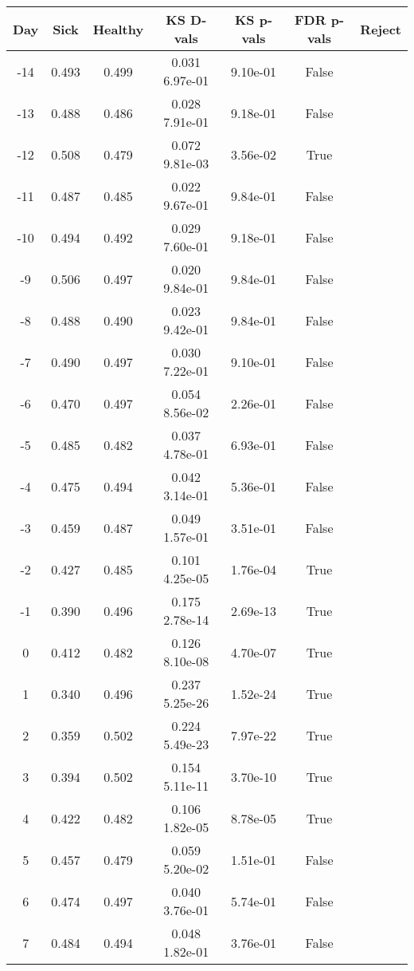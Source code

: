 \begin{tabular}{c|c|c|c|c|c|c}
Day &  Sick & Healthy &  KS D-vals &  KS p-vals & FDR p-vals & Reject\\
\hline
-14 & 0.493 &   0.499 &   0.031   6.97e-01 &   9.10e-01 &  False\\
-13 & 0.488 &   0.486 &   0.028   7.91e-01 &   9.18e-01 &  False\\
-12 & 0.508 &   0.479 &   0.072   9.81e-03 &   3.56e-02 &   True\\
-11 & 0.487 &   0.485 &   0.022   9.67e-01 &   9.84e-01 &  False\\
-10 & 0.494 &   0.492 &   0.029   7.60e-01 &   9.18e-01 &  False\\
 -9 & 0.506 &   0.497 &   0.020   9.84e-01 &   9.84e-01 &  False\\
 -8 & 0.488 &   0.490 &   0.023   9.42e-01 &   9.84e-01 &  False\\
 -7 & 0.490 &   0.497 &   0.030   7.22e-01 &   9.10e-01 &  False\\
 -6 & 0.470 &   0.497 &   0.054   8.56e-02 &   2.26e-01 &  False\\
 -5 & 0.485 &   0.482 &   0.037   4.78e-01 &   6.93e-01 &  False\\
 -4 & 0.475 &   0.494 &   0.042   3.14e-01 &   5.36e-01 &  False\\
 -3 & 0.459 &   0.487 &   0.049   1.57e-01 &   3.51e-01 &  False\\
 -2 & 0.427 &   0.485 &   0.101   4.25e-05 &   1.76e-04 &   True\\
 -1 & 0.390 &   0.496 &   0.175   2.78e-14 &   2.69e-13 &   True\\
  0 & 0.412 &   0.482 &   0.126   8.10e-08 &   4.70e-07 &   True\\
  1 & 0.340 &   0.496 &   0.237   5.25e-26 &   1.52e-24 &   True\\
  2 & 0.359 &   0.502 &   0.224   5.49e-23 &   7.97e-22 &   True\\
  3 & 0.394 &   0.502 &   0.154   5.11e-11 &   3.70e-10 &   True\\
  4 & 0.422 &   0.482 &   0.106   1.82e-05 &   8.78e-05 &   True\\
  5 & 0.457 &   0.479 &   0.059   5.20e-02 &   1.51e-01 &  False\\
  6 & 0.474 &   0.497 &   0.040   3.76e-01 &   5.74e-01 &  False\\
  7 & 0.484 &   0.494 &   0.048   1.82e-01 &   3.76e-01 &  False\\

\end{tabular}
